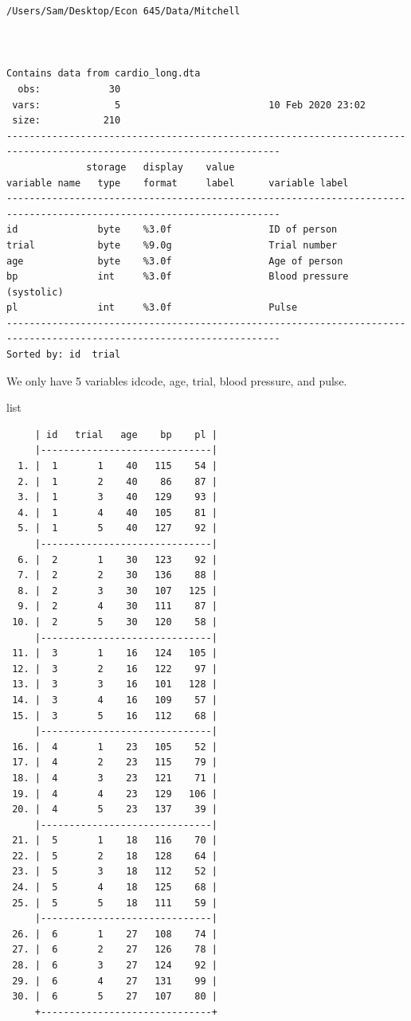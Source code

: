 \documentclass[
]{book}
\newenvironment{Shaded}{\begin{snugshade}}{\end{snugshade}}
\newcommand{\OtherTok}[1]{\textcolor[rgb]{0.56,0.35,0.01}{#1}}
\begin{document}
\begin{verbatim}
/Users/Sam/Desktop/Econ 645/Data/Mitchell



Contains data from cardio_long.dta
  obs:            30                          
 vars:             5                          10 Feb 2020 23:02
 size:           210                          
----------------------------------------------------------------------------------------------------------------------
              storage   display    value
variable name   type    format     label      variable label
----------------------------------------------------------------------------------------------------------------------
id              byte    %3.0f                 ID of person
trial           byte    %9.0g                 Trial number
age             byte    %3.0f                 Age of person
bp              int     %3.0f                 Blood pressure (systolic)
pl              int     %3.0f                 Pulse
----------------------------------------------------------------------------------------------------------------------
Sorted by: id  trial
\end{verbatim}

We only have 5 variables idcode, age, trial, blood pressure, and pulse.

\begin{Shaded}
\begin{Highlighting}[]
\OtherTok{list}
\end{Highlighting}
\end{Shaded}

\begin{verbatim}
     | id   trial   age    bp    pl |
     |------------------------------|
  1. |  1       1    40   115    54 |
  2. |  1       2    40    86    87 |
  3. |  1       3    40   129    93 |
  4. |  1       4    40   105    81 |
  5. |  1       5    40   127    92 |
     |------------------------------|
  6. |  2       1    30   123    92 |
  7. |  2       2    30   136    88 |
  8. |  2       3    30   107   125 |
  9. |  2       4    30   111    87 |
 10. |  2       5    30   120    58 |
     |------------------------------|
 11. |  3       1    16   124   105 |
 12. |  3       2    16   122    97 |
 13. |  3       3    16   101   128 |
 14. |  3       4    16   109    57 |
 15. |  3       5    16   112    68 |
     |------------------------------|
 16. |  4       1    23   105    52 |
 17. |  4       2    23   115    79 |
 18. |  4       3    23   121    71 |
 19. |  4       4    23   129   106 |
 20. |  4       5    23   137    39 |
     |------------------------------|
 21. |  5       1    18   116    70 |
 22. |  5       2    18   128    64 |
 23. |  5       3    18   112    52 |
 24. |  5       4    18   125    68 |
 25. |  5       5    18   111    59 |
     |------------------------------|
 26. |  6       1    27   108    74 |
 27. |  6       2    27   126    78 |
 28. |  6       3    27   124    92 |
 29. |  6       4    27   131    99 |
 30. |  6       5    27   107    80 |
     +------------------------------+
\end{verbatim}
\end{document}
